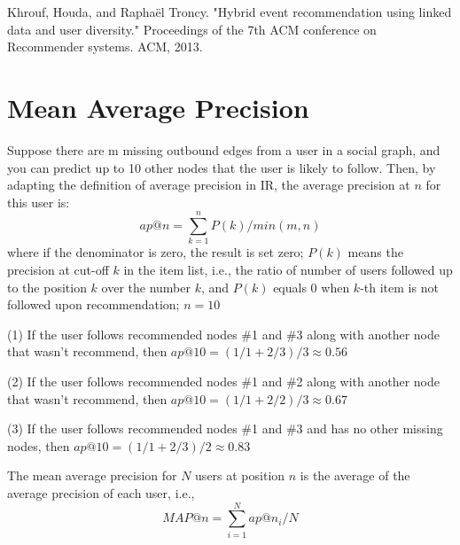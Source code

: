 \documentclass{article}
\begin{document}
\noindent[4] Khrouf, Houda, and Raphaël Troncy. "Hybrid event recommendation using linked data and user diversity." Proceedings of the 7th ACM conference on Recommender systems. ACM, 2013.

\appendix
\section{Mean Average Precision}
Suppose there are m missing outbound edges from a user in a social graph, and you can predict up to 10 other nodes that the user is likely to follow. Then, by adapting the definition of average precision in IR, the average precision at $n$ for this user is:
\begin{equation}
ap@n=\sum_{k=1}^n P(k)/min(m,n)
\end{equation}
where if the denominator is zero, the result is set zero; $P(k)$ means the precision at cut-off $k$ in the item list, i.e., the ratio of number of users followed up to the position $k$ over the number $k$, and $P(k)$ equals 0 when $k$-th item is not followed upon recommendation; $n = 10$

(1) If the user follows recommended nodes \#1 and \#3 along with another node that wasn't recommend, then $ap@10 = (1/1 + 2/3)/3 ≈ 0.56$

(2) If the user follows recommended nodes \#1 and \#2 along with another node that wasn't recommend, then $ap@10 = (1/1 + 2/2)/3 ≈ 0.67$

(3) If the user follows recommended nodes \#1 and \#3 and has no other missing nodes, then $ap@10 = (1/1 + 2/3)/2 ≈ 0.83$

The mean average precision for $N$ users at position $n$ is the average of the average precision of each user, i.e.,
\begin{equation}
MAP@n=\sum_{i=1}^N ap@n_i /N
\end{equation}
\end{document}
